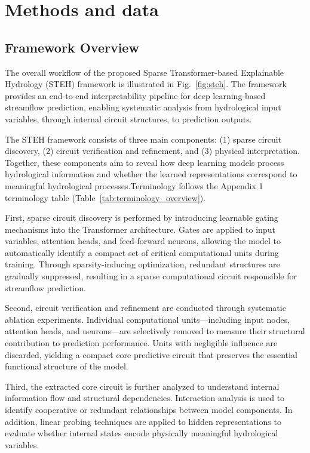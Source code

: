 \section{Methods and data}

\subsection{Framework Overview}

The overall workflow of the proposed Sparse Transformer-based Explainable Hydrology (STEH) framework is illustrated in Fig.~\ref{fig:steh}. The framework provides an end-to-end interpretability pipeline for deep learning-based streamflow prediction, enabling systematic analysis from hydrological input variables, through internal circuit structures, to prediction outputs.

The STEH framework consists of three main components: (1) sparse circuit discovery, (2) circuit verification and refinement, and (3) physical interpretation. Together, these components aim to reveal how deep learning models process hydrological information and whether the learned representations correspond to meaningful hydrological processes.Terminology follows the Appendix 1 terminology table (Table~\ref{tab:terminology_overview}).

First, sparse circuit discovery is performed by introducing learnable gating mechanisms into the Transformer architecture. Gates are applied to input variables, attention heads, and feed-forward neurons, allowing the model to automatically identify a compact set of critical computational units during training. Through sparsity-inducing optimization, redundant structures are gradually suppressed, resulting in a sparse computational circuit responsible for streamflow prediction.

Second, circuit verification and refinement are conducted through systematic ablation experiments. Individual computational units—including input nodes, attention heads, and neurons—are selectively removed to measure their structural contribution to prediction performance. Units with negligible influence are discarded, yielding a compact core predictive circuit that preserves the essential functional structure of the model.

Third, the extracted core circuit is further analyzed to understand internal information flow and structural dependencies. Interaction analysis is used to identify cooperative or redundant relationships between model components. In addition, linear probing techniques are applied to hidden representations to evaluate whether internal states encode physically meaningful hydrological variables.

